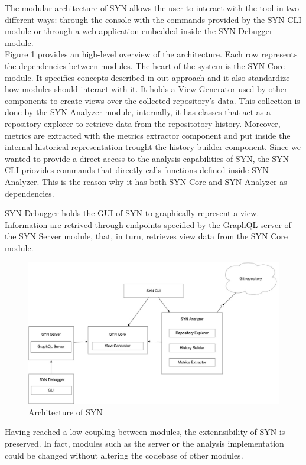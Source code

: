 The modular architecture of SYN allows the user to interact with the tool in two different ways: through the console with the commands provided by the SYN CLI module 
or through a web application embedded inside the SYN Debugger module. \\
Figure \ref{fig:architecture} provides an high-level overview of the architecture. Each row represents the dependencies between modules.
The heart of the system is the SYN Core module. 
It specifies concepts described in out approach and it also standardize how modules should interact with it.
It holds a View Generator used by other components to create views over the collected repository's data. 
This collection is done by the SYN Analyzer module, internally, it has classes that act as a repository explorer to retrieve data from the repositotory history. 
Moreover, metrics are extracted with the metrics extractor component and put inside the internal historical representation trought the history builder component. 
Since we wanted to provide a direct access to the analysis capabilities of SYN, the SYN CLI priovides commands that directly calls functions defined inside SYN Analyzer. 
This is the reason why it has both SYN Core and SYN Analyzer as dependencies. 

SYN Debugger holds the GUI of SYN to graphically represent a view. Information are retrived through endpoints specified by the GraphQL server of the SYN Server module, that, in turn, retrieves view data from the SYN Core module. 


\begin{figure}
    \center
    \includegraphics[width=\textwidth]{SYNArchitecture.jpg}
    \caption{Architecture of SYN}
    \label{fig:architecture}
\end{figure}

Having reached a low coupling between modules, the extennsibility of SYN is preserved. In fact, modules such as the server or the analysis implementation could be changed without altering the codebase of other modules. 


